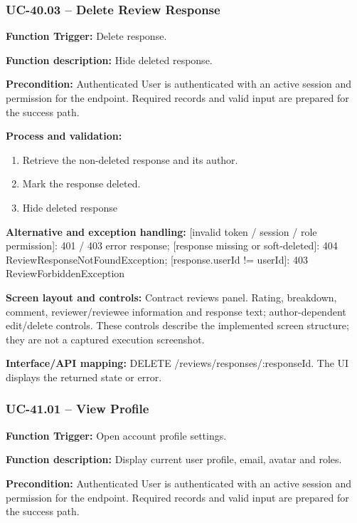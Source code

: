 \subsubsection{UC-40.03 -- Delete Review Response}
\textbf{Function Trigger:} Delete response.

\textbf{Function description:} Hide deleted response.

\textbf{Precondition:} Authenticated User is authenticated with an active session and permission for the endpoint. Required records and valid input are prepared for the success path.

\textbf{Process and validation:}
\begin{enumerate}
\item Retrieve the non-deleted response and its author.
\item Mark the response deleted.
\item Hide deleted response
\end{enumerate}
\textbf{Alternative and exception handling:} [invalid token /\allowbreak{} session /\allowbreak{} role permission]: 401 /\allowbreak{} 403 error response; [response missing or soft-deleted]: 404 Review\allowbreak{}Response\allowbreak{}Not\allowbreak{}Found\allowbreak{}Exception; [response.user\allowbreak{}Id !=\allowbreak{} user\allowbreak{}Id]: 403 Review\allowbreak{}Forbidden\allowbreak{}Exception

\textbf{Screen layout and controls:} Contract reviews panel. Rating, breakdown, comment, reviewer/\allowbreak{}reviewee information and response text; author-dependent edit/\allowbreak{}delete controls. These controls describe the implemented screen structure; they are not a captured execution screenshot.

\textbf{Interface/\allowbreak{}API mapping:} DELETE /\allowbreak{}reviews/\allowbreak{}responses/\allowbreak{}:response\allowbreak{}Id. The UI displays the returned state or error.

\subsubsection{UC-41.01 -- View Profile}
\textbf{Function Trigger:} Open account profile settings.

\textbf{Function description:} Display current user profile, email, avatar and roles.

\textbf{Precondition:} Authenticated User is authenticated with an active session and permission for the endpoint. Required records and valid input are prepared for the success path.

